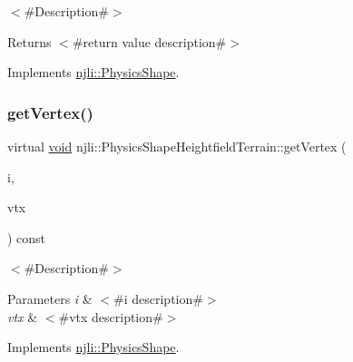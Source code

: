 $<$\#\+Description\#$>$

\begin{DoxyReturn}{Returns}
$<$\#return value description\#$>$ 
\end{DoxyReturn}


Implements \mbox{\hyperlink{classnjli_1_1_physics_shape_ac7c6b2ac373892095f8220d56f8ad6de}{njli\+::\+Physics\+Shape}}.

\mbox{\label{classnjli_1_1_physics_shape_heightfield_terrain_aaeba3305211ed8ee895c16cde919d47a}} 
\subsubsection{\texorpdfstring{get\+Vertex()}{getVertex()}}
{\footnotesize\ttfamily virtual \mbox{\hyperlink{_thread_8h_af1e856da2e658414cb2456cb6f7ebc66}{void}} njli\+::\+Physics\+Shape\+Heightfield\+Terrain\+::get\+Vertex (\begin{DoxyParamCaption}\item[{int}]{i,  }\item[{bt\+Vector3 \&}]{vtx }\end{DoxyParamCaption}) const\hspace{0.3cm}{\ttfamily [virtual]}}

$<$\#\+Description\#$>$


\begin{DoxyParams}{Parameters}
{\em i} & $<$\#i description\#$>$ \\
\hline
{\em vtx} & $<$\#vtx description\#$>$ \\
\hline
\end{DoxyParams}


Implements \mbox{\hyperlink{classnjli_1_1_physics_shape_acb05a16bdbfa5cee6dcbab5c253eb78e}{njli\+::\+Physics\+Shape}}.

\mbox{\label{classnjli_1_1_physics_shape_heightfield_terrain_a5a0231f5fba81a27ec7a66a0ffd084a7}} 

